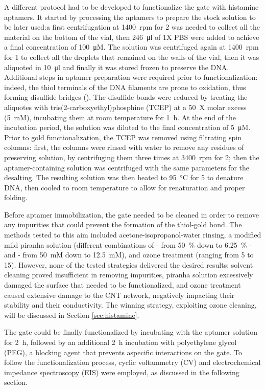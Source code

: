 A different protocol had to be developed to functionalize the gate with histamine aptamers. It started by processing the aptamers to prepare the stock solution to be later used:a first centrifugation at \SI{1400}{rpm} for \SI{2}{\min} was needed to collect all the material on the bottom of the vial, then 
\SI{246}{\ul} of 1X PBS were added to achieve a final concentration of \SI{100}{\micro M}. The solution was centrifuged again at \SI{1400}{rpm} for \SI{1}{\min} to collect all the droplets that remained on the walls of the vial, then it was aliquoted in \SI{10}{\ul} and finally it was stored frozen to preserve the DNA. Additional steps in aptamer preparation were required prior to functionalization: indeed, the thiol terminals of the DNA filaments are prone to oxidation, thus forming disulfide bridges (). The disulfide bonds were reduced by treating the aliquotes with tris(2-carboxyethyl)phosphine (TCEP) at a \SI{50}{X} molar excess (\SI{5}{mM}), incubating them at room temperature for \SI{1}{\hour}. At the end of the incubation period, the solution was diluted to the final concentration of \SI{5}{\micro M}. Prior to gold functionalization, the TCEP was removed using filtrating spin columns: first, the columns were rinsed with water to remove any residues of preserving solution, by centrifuging them three times at \SI{3400}{rpm} for \SI{2}{\min}; then the aptamer-containing solution was centrifuged with the same parameters for the desalting. The resulting solution was then heated to \SI{95}{\celsius} for \SI{5}{\min} to denature DNA, then cooled to room temperature to allow for renaturation and proper folding.

Before aptamer immobilization, the gate needed to be cleaned in order to remove any impurities that could prevent the formation of the thiol-gold bond. The methods tested to this aim included acetone-isopropanol-water rinsing, a modified mild piranha solution (different combinations of  - from \SI{50}{\%} down to \SI{6.25}{\%} - and  - from \SI{50}{mM} down to \SI{12.5}{mM}), and ozone treatment (ranging from \SI{5}{\min} to \SI{15}{\min}). However, none of the tested strategies delivered the desired results: solvent cleaning proved insufficient in removing impurities, piranha solution excessively damaged the surface that needed to be functionalized, and ozone treatment caused extensive damage to the CNT network, negatively impacting their stability and their conductivity. The winning strategy, exploiting ozone cleaning, will be discussed in Section \ref{sec:histamine}.

The gate could be finally functionalized by incubating with the aptamer solution for \SI{2}{\hour}, followed by an additional \SI{2}{\hour} incubation with polyethylene glycol (PEG), a blocking agent that prevents aspecific interactions on the gate. To follow the functionalization process, cyclic voltammetry (CV) and electrochemical impedance spectroscopy (EIS) were employed, as discussed in the following section.

